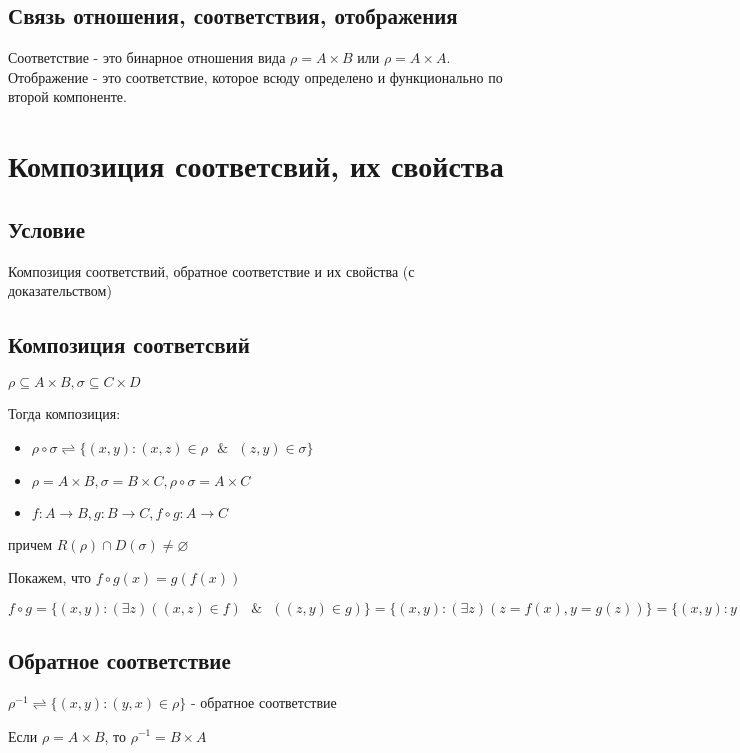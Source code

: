 \documentclass{report}
\newcommand{\band}{\mbox{ } \& \mbox{ }}
\begin{document}
\subsection{Связь отношения, соответствия, отображения}
Соответствие - это бинарное отношения вида $\rho = A \times B$ или $\rho = A \times A$.
Отображение - это соответствие, которое всюду определено и функционально по второй компоненте.

\section{Композиция соответсвий, их свойства}
\subsection{Условие}
Композиция соответствий, обратное соответствие и их свойства (с доказательством)

\subsection{Композиция соответсвий}
$\rho \subseteq A \times B, \sigma \subseteq C \times D$

Тогда композиция:
\begin{itemize}
    \item $\rho \circ \sigma \rightleftharpoons \{(x,y): (x,z) \in \rho \band (z,y) \in \sigma\}$
    \item  $\rho = A \times B, \sigma = B \times C, \rho \circ \sigma = A \times C$
    \item $f: A \rightarrow B, g: B \rightarrow C, f \circ g: A \rightarrow C$
\end{itemize}
причем $R(\rho) \cap D(\sigma) \neq \varnothing$

\medskip

Покажем, что $f \circ g(x) = g(f(x))$

$f \circ g = \{(x,y): (\exists z)((x,z) \in f) \band ((z,y) \in g)\} = \{(x,y):(\exists z)(z = f(x), y = g(z))\} = \{(x,y): y = g(f(x))\}$

\subsection{Обратное соответствие}
$\rho^{-1} \rightleftharpoons \{(x,y): (y,x) \in \rho\}$ - обратное соответствие

Если $\rho = A \times B$, то $\rho^{-1} = B \times A$
\end{document}
